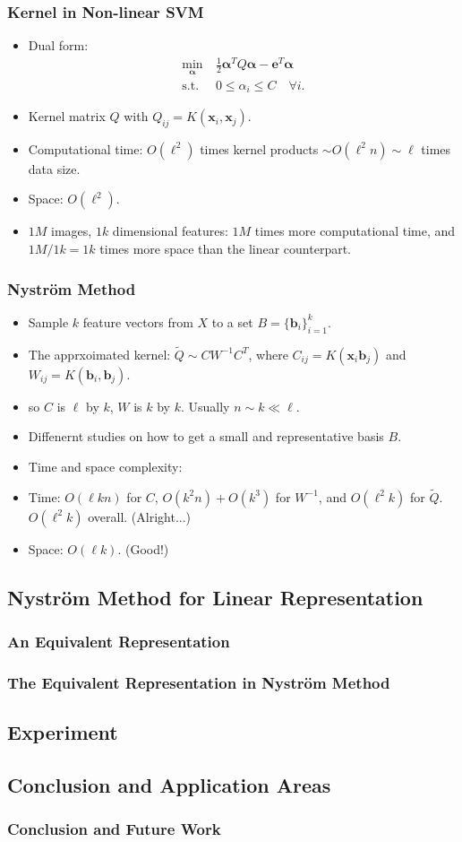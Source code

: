 \documentclass[14pt,xcolor=pstdvips]{beamer}
\def\bx{{\boldsymbol x}}
\def\bb{{\boldsymbol b}}
\def\balpha{{\boldsymbol \alpha}}
\def\be{{\boldsymbol e}}
\begin{document}
\begin{frame}
  \frametitle{Kernel in Non-linear SVM}
  \begin{itemize}
    \item Dual form:
    \begin{align}
    \label{eq:svmdual} \nonumber
    \min_{\balpha} \  &  \frac{1}{2} \balpha^T Q  \balpha - \be^T \balpha \nonumber \\
    \mbox{s.t.} \  & 0 \le \alpha_i \le C \quad \forall i \mbox{.} \nonumber
    \end{align}
    \item Kernel matrix $Q$ with $Q_{ij} = K(\bx_i, \bx_j)$.
    \pause
    \item [] Computational time: $O(\ell^2)$ times kernel products $\sim O(\ell^2 n) \sim \ell$ times data size.
    \item [] Space: $O(\ell^2)$.
    \pause
    \item $1M$ images, $1k$ dimensional features: $1M$ times more computational time, and $1M/1k = 1k$ times more space than the linear counterpart.
  \end{itemize}
\end{frame}

\begin{frame}
  \frametitle{Nystr\"om Method}
  \begin{itemize}
    \item Sample $k$ feature vectors from $X$ to a set $B = \{\bb_i\}_{i = 1}^{k}$.
    \item The apprxoimated kernel: $\tilde{Q} \sim CW^{-1}C^T$,
    where $C_{ij} = K(\bx_i \bb_j)$ and $W_{ij} = K(\bb_i, \bb_j)$.
    \item [] so $C$ is $\ell$ by $k$, $W$ is $k$ by $k$. Usually $n \sim k \ll \ell$.  
    \item Diffenernt studies on how to get a small and representative basis $B$.
    \pause
    \item Time and space complexity:
    \item [] Time: $O(\ell k n)$ for $C$, $O(k^2 n) + O(k^3)$ for $W^{-1}$, and $O(\ell^2 k)$ for $\tilde{Q}$. $O(\ell^2 k)$ overall. (Alright...)
    \item [] Space: $O(\ell k)$. (Good!)
  \end{itemize}
\end{frame}

\subsection{Nystr\"om Method for Linear Representation}
\begin{frame}
  \frametitle{An Equivalent Representation}
\end{frame}

\begin{frame}
  \frametitle{The Equivalent Representation in Nystr\"om Method}
\end{frame}

\subsection{Experiment}

\subsection{Conclusion and Application Areas}
\begin{frame}
  \frametitle{Conclusion and Future Work}
\end{frame}
\end{document}
